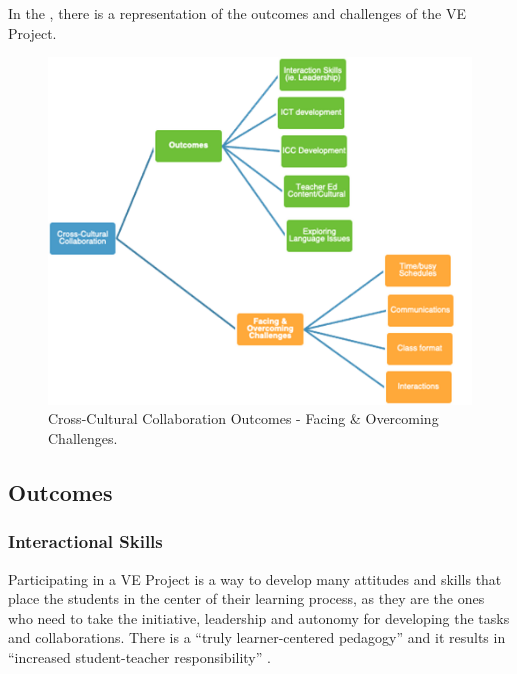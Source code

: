 In the , there is a representation of the outcomes and
challenges of the VE Project.
	
	
\begin{figure}[!htpb]
\centering
\begin{minipage}{0.6\textwidth}
\includegraphics[width=\textwidth]{figure01.png}
\caption{Cross-Cultural Collaboration Outcomes - Facing \& Overcoming Challenges.}
\label{fig-01}
\end{minipage}
\end{figure}


\subsection{Outcomes}\label{sub-sec-outcomes}
\subsubsection{Interactional Skills}\label{sub-sub-sec-interactional}

Participating in a VE Project is a way to develop many attitudes and
skills that place the students in the center of their learning process,
as they are the ones who need to take the initiative, leadership and
autonomy for developing the tasks and collaborations. There is a \enquote{truly
learner-centered pedagogy} and it results in \enquote{increased
student-teacher responsibility} \cite{sadler2016twelve}.
		
